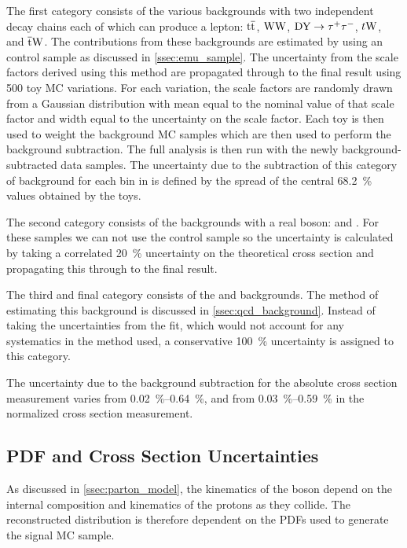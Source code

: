 The first category consists of the various backgrounds with two independent
decay chains each of which can produce a lepton: $\text{t} \overline{\text{t}}$, $\text{W}\text{W}$,
$\text{DY} \to \tau^{+} \tau^{-}$, $t\text{W}$, and $\overline{\text{t}}\text{W}$. The contributions from these backgrounds
are estimated by using an \emu control sample as discussed in
\cref{ssec:emu_sample}. The uncertainty from the scale factors derived
using this method are propagated through to the final result using 500 toy MC
variations. For each variation, the scale factors are randomly drawn from a
Gaussian distribution with mean equal to the nominal value of that scale factor
and width equal to the uncertainty on the scale factor. Each toy is then used
to weight the background MC samples  which are then used to perform the
background subtraction. The full analysis is then run with the newly
background-subtracted data samples. The uncertainty due to the subtraction of
this category of background for each bin in \phistar is defined by the spread
of the central \SI{68.2}{\percent} values obtained by the toys.

The second category consists of the backgrounds with a real \Z boson: \ZZ and
\WZ. For these samples we can not use the \emu control sample so the
uncertainty is calculated by taking a correlated \SI{20}{\percent} uncertainty
on the theoretical cross section and propagating this through to the final
result.

The third and final category consists of the \QCDjets and \wjets backgrounds.
The method of estimating this background is discussed in
\cref{ssec:qcd_background}. Instead of taking the uncertainties from the fit,
which would not account for any systematics in the method used, a conservative
\SI{100}{\percent} uncertainty is assigned to this category.

The uncertainty due to the background subtraction for the absolute cross
section measurement varies from \SIrange{0.02}{0.64}{\percent}, and from
\SIrange{0.03}{0.59}{\percent} in the normalized cross section measurement.

\subsection{PDF and Cross Section Uncertainties}
\label{ssec:pdf_uncertainties}

As discussed in \cref{ssec:parton_model}, the kinematics of the \Z boson
depend on the internal composition and kinematics of the protons as they
collide. The reconstructed \phistar distribution is therefore dependent on the
PDFs used to generate the signal MC sample.

